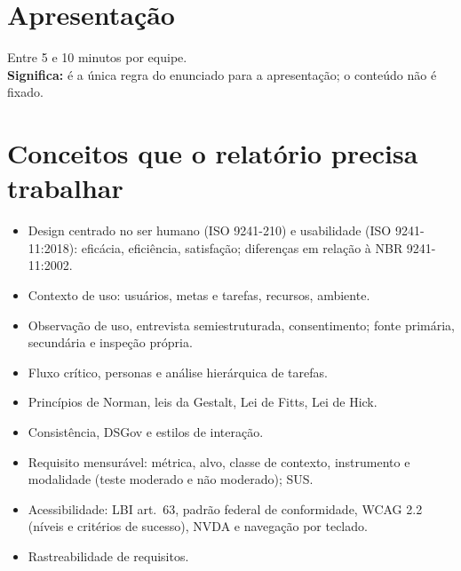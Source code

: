 \documentclass[11pt,a4paper]{article}
\newcommand{\obs}[1]{\\{\small\color{cinza}\textbf{Significa:} #1}}
\begin{document}
\section{Apresentação}

\begin{checks}
  \item Entre 5 e 10 minutos por equipe.
    \obs{é a única regra do enunciado para a apresentação; o conteúdo não é fixado.}
\end{checks}

\section{Conceitos que o relatório precisa trabalhar}

\begin{itemize}[leftmargin=1.2em,itemsep=0.15em]
  \item Design centrado no ser humano (ISO 9241-210) e usabilidade (ISO 9241-11:2018): eficácia, eficiência, satisfação; diferenças em relação à NBR 9241-11:2002.
  \item Contexto de uso: usuários, metas e tarefas, recursos, ambiente.
  \item Observação de uso, entrevista semiestruturada, consentimento; fonte primária, secundária e inspeção própria.
  \item Fluxo crítico, personas e análise hierárquica de tarefas.
  \item Princípios de Norman, leis da Gestalt, Lei de Fitts, Lei de Hick.
  \item Consistência, DSGov e estilos de interação.
  \item Requisito mensurável: métrica, alvo, classe de contexto, instrumento e modalidade (teste moderado e não moderado); SUS.
  \item Acessibilidade: LBI art.~63, padrão federal de conformidade, WCAG 2.2 (níveis e critérios de sucesso), NVDA e navegação por teclado.
  \item Rastreabilidade de requisitos.
\end{itemize}
\end{document}
